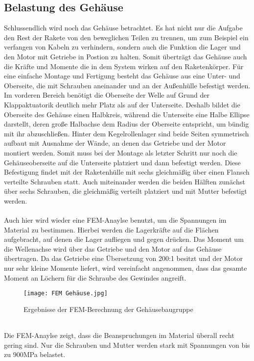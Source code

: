 \subsection{Belastung des Gehäuse}
Schlussendlich wird noch das Gehäuse betrachtet. Es hat nicht nur die Aufgabe den Rest der Rakete von den beweglichen Teilen zu trennen, um zum Beispiel ein verfangen von Kabeln zu verhindern, sondern auch die Funktion die Lager und den Motor mit Getriebe in Postion zu halten. Somit überträgt das Gehäuse auch die Kräfte und Momente die in dem System wirken auf den Raketenkörper. Für eine einfache Montage und Fertigung besteht das Gehäuse aus eine Unter- und Oberseite, die mit Schrauben aneinander und an der Außenhülle befestigt werden. Im vorderen Bereich benötigt die Oberseite der Welle auf Grund der Klappaktuatorik deutlich mehr Platz als auf der Unterseite. Deshalb bildet die Oberseite des Gehäuse einen Halbkreis, während die Unterseite eine Halbe Ellipse darstellt, deren große Halbachse dem Radius der Oberseite entspricht, um bündig mit ihr abzuschließen. Hinter dem Kegelrollenlager sind beide Seiten symmetrisch aufbaut mit Ausnahme der Wände, an denen das Getriebe und der Motor montiert werden. Somit muss bei der Montage als letzter Schritt nur noch die Gehäuseoberseite auf die Unterseite platziert und dann befestigt werden.
Diese Befestigung findet mit der Raketenhülle mit sechs gleichmäßig über einen Flansch verteilte Schrauben statt. Auch miteinander werden die beiden Hälften zunächst über sechs Schrauben, die gleichmäßig verteilt platziert und mit Mutter befestigt werden.
\\~\\
Auch hier wird wieder eine FEM-Anaylse benutzt, um die Spannungen im Material zu bestimmen. Hierbei werden die Lagerkräfte auf die Flächen aufgebracht, auf denen die Lager aufliegen und gegen drücken. Das Moment um die Wellenachse wird über das Getriebe und den Motor auf das Gehäuse übertragen. Da das Getriebe eine Übersetzung von 200:1 besitzt und der Motor nur sehr kleine Momente liefert, wird vereinfacht angenommen, dass das gesamte Moment an Löchern für die Schraube des Gewindes angreift.
\begin{figure}[h] 
	\centering
	\texttt{[image: FEM Gehäuse.jpg]}
	\caption{Ergebnisse der FEM-Berechnung der Gehäusebaugruppe}
\end{figure}\\
Die FEM-Anaylse zeigt, dass die Beanspruchungen im Material überall recht gering sind. Nur die Schrauben und Mutter werden stark mit Spannungen von bis zu $900$MPa belastet.
